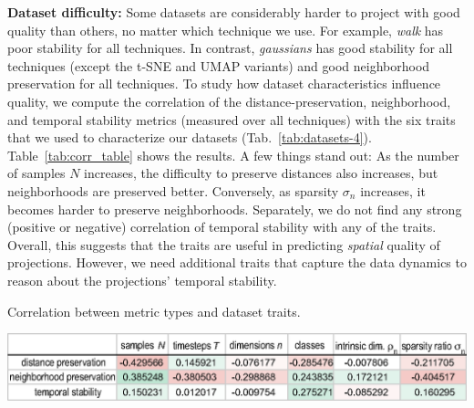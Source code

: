 %




\noindent\textbf{Dataset difficulty:} Some datasets are considerably harder to project with good quality than others, no matter which technique we use. For example, \emph{walk} has poor stability for all techniques. In contrast, \emph{gaussians} has good stability for all techniques (except the t-SNE and UMAP variants) and good neighborhood preservation for all techniques. To study how dataset characteristics influence quality, we compute the correlation of the distance-preservation, neighborhood, and temporal stability metrics (measured over all techniques) with the six traits that we used to characterize our datasets (Tab.~\ref{tab:datasets-4}). Table~\ref{tab:corr_table} shows the results. A few things stand out: As the number of samples $N$ increases, the difficulty to preserve distances also increases, but neighborhoods are preserved better. Conversely, as sparsity $\sigma_n$ increases, it becomes harder to preserve neighborhoods. Separately, we do not find any strong (positive or negative) correlation of temporal stability with any of the traits. Overall, this suggests that the traits are useful in predicting \emph{spatial} quality of projections. However, we need additional traits that capture the data dynamics to reason about the projections' temporal stability.

\begin{table}[tb]
\centering
\caption{Correlation between metric types and dataset traits.}
\label{tab:corr_table}
\includegraphics[width=1.01\linewidth]{figures/projection-evaluation/corr_table.eps}
\end{table}

